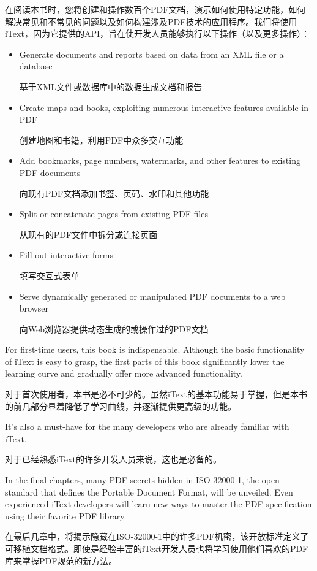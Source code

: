 在阅读本书时，您将创建和操作数百个PDF文档，演示如何使用特定功能，如何解决常见和不常见的问题以及如何构建涉及PDF技术的应用程序。我们将使用iText，因为它提供的API，旨在使开发人员能够执行以下操作（以及更多操作）：
\begin{itemize}
\item
Generate documents and reports based on data from an XML file or a database

基于XML文件或数据库中的数据生成文档和报告

\item
Create maps and books, exploiting numerous interactive features available in PDF

创建地图和书籍，利用PDF中众多交互功能
\item
Add bookmarks, page numbers, watermarks, and other features to existing PDF
documents

向现有PDF文档添加书签、页码、水印和其他功能

\item
Split or concatenate pages from existing PDF files

从现有的PDF文件中拆分或连接页面
\item
Fill out interactive forms

填写交互式表单
\item
Serve dynamically generated or manipulated PDF documents to a web browser 

向Web浏览器提供动态生成的或操作过的PDF文档
\end{itemize}
For first-time users, this book is indispensable. Although the basic functionality of iText is easy to grasp, the first parts of this book significantly lower the learning curve and gradually offer more advanced functionality.

对于首次使用者，本书是必不可少的。虽然iText的基本功能易于掌握，但是本书的前几部分显着降低了学习曲线，并逐渐提供更高级的功能。

It’s also a must-have for the many developers who are already familiar with iText.

对于已经熟悉iText的许多开发人员来说，这也是必备的。

In the final chapters, many PDF secrets hidden in ISO-32000-1, the open standard that defines the Portable Document Format, will be unveiled. Even experienced iText developers will learn new ways to master the PDF specification using their favorite PDF library.

在最后几章中，将揭示隐藏在ISO-32000-1中的许多PDF机密，该开放标准定义了可移植文档格式。即使是经验丰富的iText开发人员也将学习使用他们喜欢的PDF库来掌握PDF规范的新方法。

